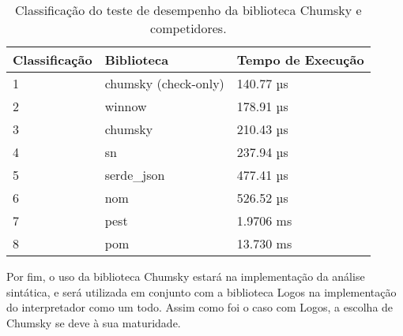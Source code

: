 \begin{table}[H]
	\centering
	\caption{Classificação do teste de desempenho da biblioteca Chumsky e competidores.}
	{
		\begin{tabular}{lll}
			\hline
			\textbf{Classificação} & \textbf{Biblioteca}  & \textbf{Tempo de Execução} \\ \hline
			1                      & chumsky (check-only) & 140.77 µs                  \\
			2                      & winnow               & 178.91 µs                  \\
			3                      & chumsky              & 210.43 µs                  \\
			4                      & sn                   & 237.94 µs                  \\
			5                      & serde\_json          & 477.41 µs                  \\
			6                      & nom                  & 526.52 µs                  \\
			7                      & pest                 & 1.9706 ms                  \\
			8                      & pom                  & 13.730 ms                  \\ \hline
		\end{tabular}
	}
	\label{tab:chumsky_benchmark}
\end{table}

Por fim, o uso da biblioteca Chumsky estará na implementação da análise sintática, e será utilizada em conjunto com a biblioteca Logos na implementação do interpretador como um todo. Assim como foi o caso com Logos, a escolha de Chumsky se deve à sua maturidade.
